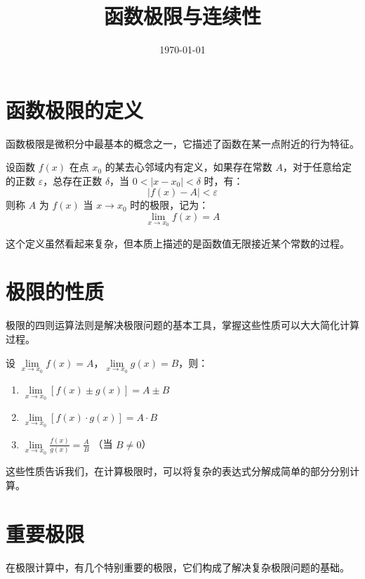 \documentclass{ctexart}
\title{函数极限与连续性}
\date{\today}
\begin{document}
\maketitle

\section{函数极限的定义}
函数极限是微积分中最基本的概念之一，它描述了函数在某一点附近的行为特征。

\begin{definition}[函数极限]
设函数 $f(x)$ 在点 $x_0$ 的某去心邻域内有定义，如果存在常数 $A$，对于任意给定的正数 $\varepsilon$，总存在正数 $\delta$，当 $0<|x-x_0|<\delta$ 时，有：
\[ |f(x)-A|<\varepsilon \]
则称 $A$ 为 $f(x)$ 当 $x \to x_0$ 时的极限，记为：
\[ \lim_{x \to x_0} f(x) = A \]
\end{definition}

这个定义虽然看起来复杂，但本质上描述的是函数值无限接近某个常数的过程。

\section{极限的性质}
极限的四则运算法则是解决极限问题的基本工具，掌握这些性质可以大大简化计算过程。

\begin{theorem}[极限四则运算]
设 $\lim\limits_{x \to x_0} f(x) = A$，$\lim\limits_{x \to x_0} g(x) = B$，则：
\begin{enumerate}
    \item $\lim\limits_{x \to x_0} [f(x) \pm g(x)] = A \pm B$
    \item $\lim\limits_{x \to x_0} [f(x) \cdot g(x)] = A \cdot B$
    \item $\lim\limits_{x \to x_0} \frac{f(x)}{g(x)} = \frac{A}{B}$ （当 $B \neq 0$）
\end{enumerate}
\end{theorem}

这些性质告诉我们，在计算极限时，可以将复杂的表达式分解成简单的部分分别计算。

\section{重要极限}
在极限计算中，有几个特别重要的极限，它们构成了解决复杂极限问题的基础。
\end{document}
